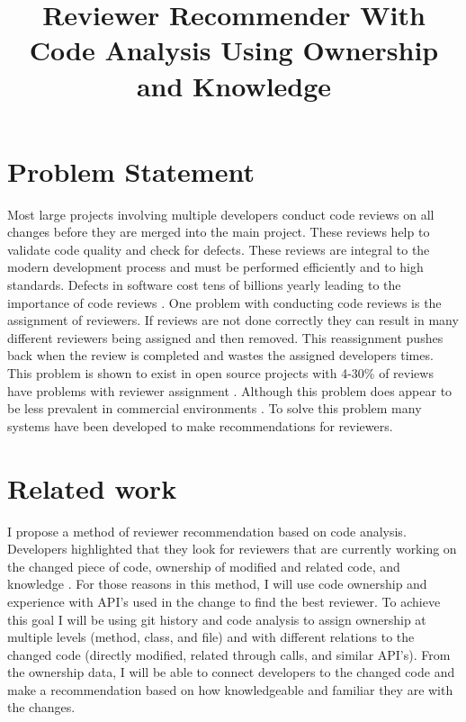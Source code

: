\documentclass[conference]{ieee/IEEEtran}
\begin{document}
\title{Reviewer Recommender With Code Analysis Using Ownership and Knowledge}
\author{
  }

\maketitle

\section{Problem Statement}
Most large projects involving multiple developers conduct code reviews on all changes before they are merged into the main project.
These reviews help to validate code quality and check for defects.
These reviews are integral to the modern development process and must be performed efficiently and to high standards.
Defects in software cost tens of billions yearly leading to the importance of code reviews \cite{brown18}.
One problem with conducting code reviews is the assignment of reviewers.
If reviews are not done correctly they can result in many different reviewers being assigned and then removed.
This reassignment pushes back when the review is completed and wastes the assigned developers times.
This problem is shown to exist in open source projects with 4-30\% of reviews have problems with reviewer assignment \cite{thongtanunam15}.
Although this problem does appear to be less prevalent in commercial environments \cite{kovalenko18}.
To solve this problem many systems have been developed to make recommendations for reviewers.


\section{Related work}
I propose a method of reviewer recommendation based on code analysis.
Developers highlighted that they look for reviewers that are currently working on the changed piece of code, ownership of modified and related code, and knowledge \cite{kovalenko18}.
For those reasons in this method, I will use code ownership and experience with API’s used in the change to find the best reviewer.
To achieve this goal I will be using git history and code analysis to assign ownership at multiple levels (method, class, and file) and with different relations to the changed code (directly modified, related through calls, and similar API’s).
From the ownership data, I will be able to connect developers to the changed code and make a recommendation based on how knowledgeable and familiar they are with the changes.
\end{document}
